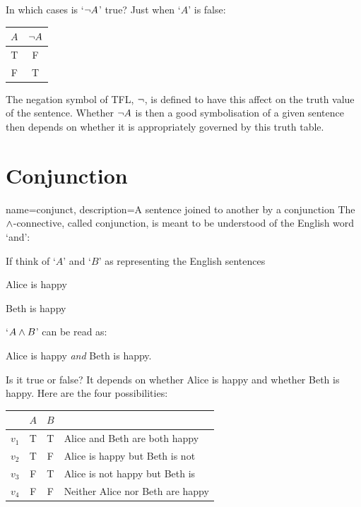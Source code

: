 In which cases is `$\neg A$' true? Just when `$A$' is false: 
\begin{center}
	\begin{tabular}{c|c}
		$A$&$\neg A$\\\hline\Tstrut
		T&F\\
		F&T
	\end{tabular}
\end{center}

The negation symbol of TFL, $\neg$, is defined to have this affect on the truth value of the sentence. Whether $\neg A$ is then a good symbolisation of a given sentence then depends on whether it is appropriately governed by this truth table.


\section{Conjunction}


{
	name=conjunct,
	description={A sentence joined to another by a \gls{conjunction}}
}
The $\mathbin{\wedge}$-connective, called conjunction, is meant to be understood of the English word `and':

If think of `$A$' and `$B$' as representing the English sentences
\begin{ekey}
	\item[A] Alice is happy
	\item[B] Beth is happy
\end{ekey}
`$A\mathbin{\wedge} B$' can be read as:
\begin{samplesent}
	\item Alice is happy \emph{and} Beth is happy.
\end{samplesent}

Is it true or false? It depends on whether Alice is happy and whether Beth is happy. 
Here are the four possibilities:
\begin{center}
	\begin{tabular}{rccl}
	&$A$&$B$\\\hline\Tstrut
	$v_1$&T&T&Alice and Beth are both happy\\
	$v_2$&T&F&Alice is happy but Beth is not\\
	$v_3$&F&T&Alice is not happy but Beth is\\
	$v_4$&F&F&Neither Alice nor Beth are happy
\end{tabular}
\end{center}

